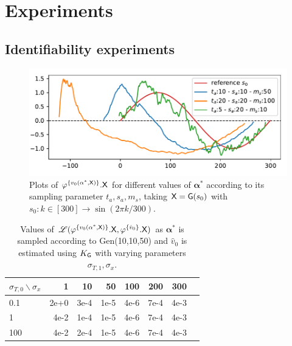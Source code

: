 \section{Experiments}

\subsection{Identifiability experiments}
\label{appendix:identifiability}

\begin{figure}[t]
  \centering
  \includegraphics[width=0.5\linewidth]{pictures/samples.pdf}
  \vspace{-2.5em}
  \caption{Plots of $\varphi^{\{v_0(\mathbf{\alpha}^*,\mathsf{X})\}}.\mathsf{X}$ for different values of $\mathbf{\alpha}^*$ according to its sampling parameter $t_a,s_a,m_s $, taking $\mathsf{X}=\mathsf{G}(s_0)$ with $s_0:k\in [300]\to \sin(2\pi k/300) $.}
  \label{fig:exemple_synthetic}
  \vspace{-1em}
\end{figure}

\begin{table}
  \caption{Values of $\mathscr{L}(\varphi^{\{v_0(\mathbf{\alpha}^*,\mathsf{X})\}}.\mathsf{X},\varphi^{\{\hat{v}_0\}}.\mathsf{X})$ as $\mathbf{\alpha}^*$ is sampled according to Gen(10,10,50) and $\hat{v}_0$ is estimated using $K_{\mathsf{G}}$ with varying parameters $\sigma_{T,1},\sigma_x$.}
    \centering
       \begin{tabular}{lrrrrrrr}
       \toprule
       $\sigma_{T,0} \backslash \sigma_x$  & 1 & 10 & 50 & 100 & 200 & 300 \\
       \midrule
       0.1 & 2e+0 & 3e-4  & 1e-5&4e-6&7e-4&4e-3 \\
      1 & 4e-2 & 1e-4  & 1e-5&4e-6&7e-4 &4e-3  \\
       100 & 4e-2 & 2e-4  & 1e-5&4e-6&7e-4&4e-3  \\
       \bottomrule
       \end{tabular}
    \label{table:synthetic2}
    \vspace{-1em}
\end{table}



